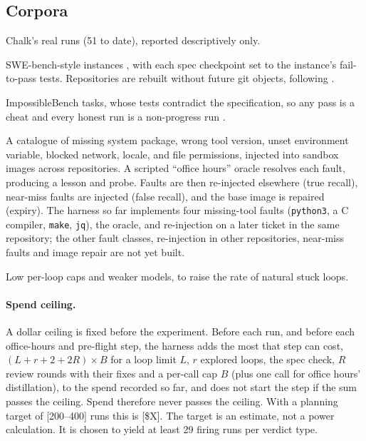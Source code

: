\documentclass[11pt]{article}
\theoremstyle{remark}
\newcommand{\tbd}[1]{\textcolor{red!70!black}{[#1]}}
\begin{document}
\subsection{Corpora}
\begin{description}[leftmargin=*,style=nextline]
\item[C0: real ledger.] Chalk's real runs (51 to date), reported descriptively only.
\item[C1: benchmark replay.] SWE-bench-style instances \citep{jimenez2023swebench}, with each spec checkpoint set to the instance's fail-to-pass tests. Repositories are rebuilt without future git objects, following \citet{sweprov2026}.
\item[C2: unsolvable controls.] ImpossibleBench tasks, whose tests contradict the specification, so any pass is a cheat and every honest run is a non-progress run \citep{zhong2025impossiblebench}.
\item[C3: seeded environment faults.] A catalogue of missing system package, wrong tool version, unset environment variable, blocked network, locale, and file permissions, injected into sandbox images across repositories. A scripted ``office hours'' oracle resolves each fault, producing a lesson and probe. Faults are then re-injected elsewhere (true recall), near-miss faults are injected (false recall), and the base image is repaired (expiry). The harness so far implements four missing-tool faults (\texttt{python3}, a C compiler, \texttt{make}, \texttt{jq}), the oracle, and re-injection on a later ticket in the same repository; the other fault classes, re-injection in other repositories, near-miss faults and image repair are not yet built.
\item[C4: handicaps.] Low per-loop caps and weaker models, to raise the rate of natural stuck loops.
\end{description}

\paragraph{Spend ceiling.}
A dollar ceiling is fixed before the experiment. Before each run, and before each office-hours and pre-flight step, the harness adds the most that step can cost, $(L + r + 2 + 2R)\times B$ for a loop limit $L$, $r$ explored loops, the spec check, $R$ review rounds with their fixes and a per-call cap $B$ (plus one call for office hours' distillation), to the spend recorded so far, and does not start the step if the sum passes the ceiling. Spend therefore never passes the ceiling. With a planning target of \tbd{200--400} runs this is \tbd{\$X}. The target is an estimate, not a power calculation. It is chosen to yield at least 29 firing runs per verdict type.
\end{document}
